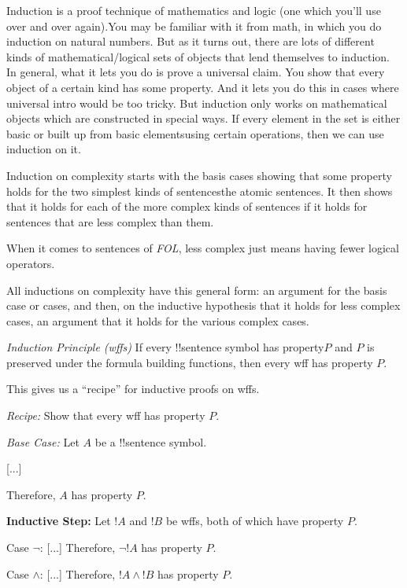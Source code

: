 \documentclass[../../include/open-logic-section]{subfiles}
\begin{document}

\begin{explain}
Induction is a proof technique of mathematics and logic (one which
you'll use over and over again).You may be familiar with it from math, in
which you do induction on natural numbers. But as it turns out, there are
lots of different kinds of mathematical/logical sets of objects that lend
themselves to induction. In general, what it lets you do is prove a
universal claim. You show that every object of a certain kind has some
property. And it lets you do this in cases where universal intro would be
too tricky. But induction only works on mathematical objects which are
constructed in special ways.
If every element in the set is either basic or built up from basic
elementsusing certain operations, then we can use induction on it.

Induction on complexity starts with the basis cases showing that some
property holds for the two simplest kinds of sentences\textemdash the
atomic sentences. It then shows that it holds for each of the more complex
kinds of sentences if it holds for sentences that are less complex than
them.

When it comes to sentences of \emph{FOL}, less complex just means having
fewer logical operators.

All inductions on complexity have this general form: an argument for the
basis case or cases, and then, on the inductive hypothesis that it holds
for less complex cases, an argument that it holds for the various complex
cases.

\emph{Induction Principle (wffs)} If every !!{sentence} symbol has
property$P$ and $P$ is preserved under the formula building functions, then
every
wff has property $P$.

This gives us a ``recipe'' for inductive proofs on wffs.

\emph{Recipe:} Show that every wff has property $P$.

\emph{Base Case:} Let $A$ be a !!{sentence} symbol.

[...]

Therefore, $A$ has property $P$.

\textbf{Inductive Step:} Let $!A$ and $!B$ be wffs, both of which have
property $P$.

Case $\lnot$: [...] Therefore, $\lnot !A$ has property $P$.

Case $\land$: [...] Therefore, $!A \land !B$ has property $P$.


\end{explain}
\end{document}
